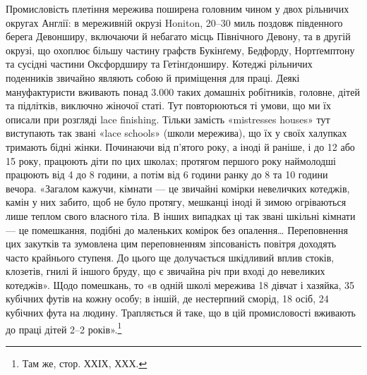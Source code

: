 Промисловість плетіння мережива поширена головним чином
у двох рільничих округах Англії: в мереживній окрузі Honiton,
20--30 миль поздовж південного берега Девонширу, включаючи
й небагато місць Північного Девону, та в другій окрузі, що
охоплює більшу частину графств Букінґему, Бедфорду, Нортґемптону
та сусідні частини Оксфордширу та Гетінґдонширу.
Котеджі рільничих поденників звичайно являють собою й приміщення
для праці. Деякі мануфактуристи вживають понад
\num{3.000} таких домашніх робітників, головне, дітей та підлітків,
виключно жіночої статі. Тут повторюються ті умови, що ми їх
описали при розгляді lace finishing. Тільки замість «mistresses
houses» тут виступають так звані «lace schools» (школи мережива),
що їх у своїх халупках тримають бідні жінки. Починаючи від
п’ятого року, а іноді й раніше, і до 12 або 15 року, працюють
діти по цих школах; протягом першого року наймолодші працюють
від 4 до 8 години, а потім від 6 години ранку до 8 та 10 години
вечора. «Загалом кажучи, кімнати — це звичайні комірки невеличких
котеджів, камін у них забито, щоб не було протягу, мешканці
іноді й зимою огріваються лише теплом свого власного
тіла. В інших випадках ці так звані шкільні кімнати — це помешкання,
подібні до маленьких комірок без опалення\dots{} Переповнення
цих закутків та зумовлена цим переповненням зіпсованість
повітря доходять часто крайнього ступеня. До цього ще
долучається шкідливий вплив стоків, клозетів, гнилі й іншого
бруду, що є звичайна річ при вході до невеликих котеджів». Щодо
помешкань, то «в одній школі мережива 18 дівчат і хазяйка,
35 кубічних футів на кожну особу; в іншій, де нестерпний сморід,
18 осіб, 24 кубічних фута на людину. Трапляється й таке, що
в цій промисловості вживають до праці дітей 2--2 років».\footnote{
Там же, стор. ХХІХ, ХХХ.
}

